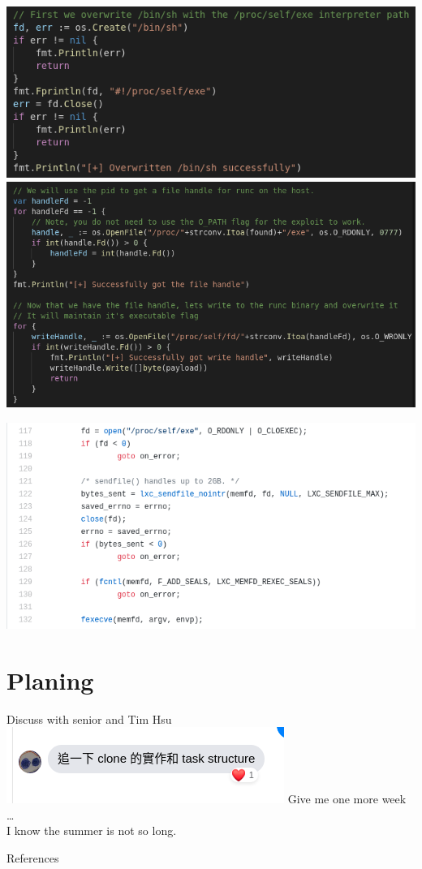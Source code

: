 \documentclass{beamer}
\begin{document}
\begin{CJK*}{UTF8}{bsmi}
  \begin{frame}
    \centering
    \includegraphics[width=.7\textwidth]{runc1.png}
    \includegraphics[width=.7\textwidth]{runc2.png}
  \end{frame}

  \begin{frame}
    \centering
    \includegraphics[width=\textwidth]{rexec.png}
  \end{frame}

  \section{Planing}
  \begin{frame}{Discuss with senior and Tim Hsu}
    \centering
    \includegraphics[width=\textwidth]{Screenshot_2021-07-16_03-14-43.png}
    Give me one more week \dots\\
    I know the summer is not so long.
  \end{frame}

  \begin{frame}{References}
    \def\bibfont{\footnotesize}
    \printbibliography
  \end{frame}

\end{CJK*}
\end{document}
